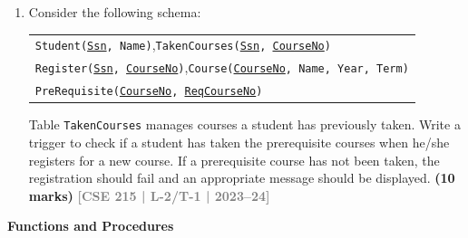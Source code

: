 \documentclass[12pt,a3paper]{article}
\newcommand{\yr}[1]{\hfill\textcolor{gray}{\small\textbf{[#1]}}}
\newcommand{\mk}[1]{\textcolor{orange!70!black}{\small\textbf{(#1 marks)}}}
\newcommand{\subtopic}[2]{%
  \vspace{10pt}
  \noindent\begin{tcolorbox}[colback=#1!8,colframe=#1,boxrule=0.6pt,arc=4pt,
    left=6pt,right=6pt,top=4pt,bottom=4pt]
    \small\bfseries\textcolor{#1}{#2}
  \end{tcolorbox}
  \vspace{2pt}
}
\begin{document}
\begin{enumerate}
\item Consider the following schema:
\begin{center}
\begin{tabular}{l}
\texttt{Student(\underline{Ssn}, Name)},\quad \texttt{TakenCourses(\underline{Ssn}, \underline{CourseNo})}\\
\texttt{Register(\underline{Ssn}, \underline{CourseNo})},\quad \texttt{Course(\underline{CourseNo}, Name, Year, Term)}\\
\texttt{PreRequisite(\underline{CourseNo}, \underline{ReqCourseNo})}
\end{tabular}
\end{center}
Table \texttt{TakenCourses} manages courses a student has previously taken. Write a trigger to check if a student has taken the prerequisite courses when he/she registers for a new course. If a prerequisite course has not been taken, the registration should fail and an appropriate message should be displayed.
\mk{10} \yr{CSE 215 | L-2/T-1 | 2023--24}

\end{enumerate}

\subtopic{cB}{Functions and Procedures}
\label{sub:s3-funcs}
\end{document}
